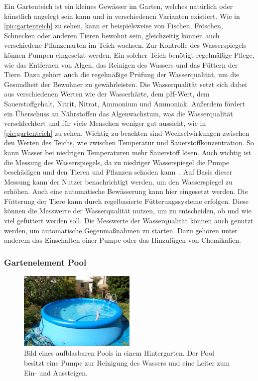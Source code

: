 
Ein Gartenteich ist ein kleines Gewässer im Garten, welches natürlich oder künstlich angelegt sein kann und in verschiedenen Varianten existiert.
Wie in \cref{pic:gartenteich} zu sehen, kann er beispielsweise von Fischen, Fröschen, Schnecken oder anderen Tieren bewohnt sein, gleichzeitig können auch verschiedene Pflanzenarten im Teich wachsen.
Zur Kontrolle des Wasserspiegels können Pumpen eingesetzt werden.
Ein solcher Teich benötigt regelmäßige Pflege, wie das Entfernen von Algen, das Reinigen des Wassers und das Füttern der Tiere.
Dazu gehört auch die regelmäßige Prüfung der Wasserqualität, um die Gesundheit der Bewohner zu gewährleisten.
Die Wasserqualität setzt sich dabei aus verschiedenen Werten wie der Wasserhärte, dem pH-Wert, dem Sauerstoffgehalt, Nitrit, Nitrat, Ammonium und Ammoniak.
Außerdem fördert ein Überschuss an Nährstoffen das Algenwachstum, was die Wasserqualität verschlechtert und für viele Menschen weniger gut aussieht, wie in \cref{pic:gartenteich} zu sehen.
Wichtig zu beachten sind Wechselwirkungen zwischen den Werten des Teichs, wie zwischen Temperatur und Sauerstoffkonzentration.
So kann Wasser bei niedrigen Temperaturen mehr Sauerstoff lösen.
Auch wichtig ist die Messung des Wasserspiegels, da zu niedriger Wasserspiegel die Pumpe beschädigen und den Tieren und Pflanzen schaden kann~\cite{TeichFische}.
Auf Basis dieser Messung kann der Nutzer benachrichtigt werden, um den Wasserspiegel zu erhöhen.
Auch eine automatische Bewässerung kann hier eingesetzt werden.
Die Fütterung der Tiere kann durch regelbasierte Fütterungssysteme erfolgen.
Diese können die Messwerte der Wasserqualität nutzen, um zu entscheiden, ob und wie viel gefüttert werden soll.
Die Messwerte der Wasserqualität können auch genutzt werden, um automatische Gegenmaßnahmen zu starten.
Dazu gehören unter anderem das Einschalten einer Pumpe oder das Hinzufügen von Chemikalien.

\subsubsection{Gartenelement Pool}
\begin{figure}[!htb]
	\centering
	\includegraphics[width=0.5\textwidth]{images/Pool.jpg}
	\caption[Bild eines aufblasbaren Pools in einem Hintergarten.]{
		Bild eines aufblasbaren Pools in einem Hintergarten.
		Der Pool besitzt eine Pumpe zur Reinigung des Wassers und eine Leiter zum Ein- und Aussteigen.\footnotemark
	}
	\label{pic:pool}
\end{figure}

